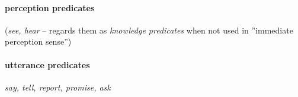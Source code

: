 \documentclass[a4,12pt]{scrartcl}
\begin{document}
\begin{exe}

\ex %

\ex %


\ex %

\ex %

\ex %

\ex %


\ex %

\ex %

\ex %


\end{exe}



\paragraph {\bf perception predicates} ({\it see, hear} – \cite[3.2.5]{noonan2007} regards them as {\it knowledge predicates} when not used in ''immediate perception sense'')

\paragraph {\bf utterance predicates} {\it say, tell, report, promise, ask} 

\begin{exe}
\ex %

\ex %

\ex %

\ex %

\end{exe}
\end{document}
